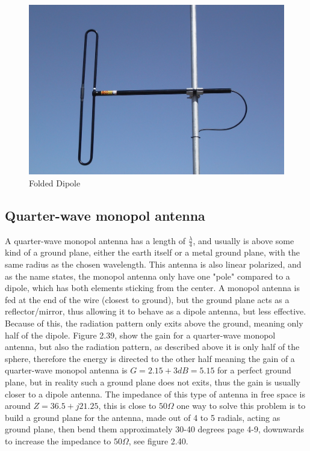 \begin{figure}[h]
\centering
\includegraphics[scale=0.9]{figures/FoldedDipole.jpg}
\caption{Folded Dipole}
\end{figure}

\subsection{Quarter-wave monopol antenna}
A quarter-wave monopol antenna has a length of $\frac{\lambda}{4}$, and usually is above some kind of a ground plane, either the earth itself or a metal ground plane, with the same radius as the chosen wavelength. This antenna is also linear polarized, and as the name states, the monopol antenna only have one "pole" compared to a dipole, which has both elements sticking from the center. A monopol antenna is fed at the end of the wire (closest to ground), but the ground plane acts as a reflector/mirror, thus allowing it to behave as a dipole antenna, but less effective. Because of this, the radiation pattern only exits above the ground, meaning only half of the dipole. Figure 2.39, show the gain for a quarter-wave monopol antenna, but also the radiation pattern, as described above it is only half of the sphere, therefore the energy is directed to the other half meaning the gain of a quarter-wave monopol antenna is $G=2.15+3dB=5.15$ for a perfect ground plane, but in reality such a ground plane does not exits, thus the gain is usually closer to a dipole antenna. The impedance of this type of antenna in free space is around $Z=36.5+j21.25$\cite{ImpedanceMonopol}, this is close to $50\Omega$ one way to solve this problem is to build a ground plane for the antenna, made out of 4 to 5 radials, acting as ground plane, then bend them approximately 30-40 degrees\cite{ARRL} page 4-9, downwards to increase the impedance to $50\Omega$, see figure 2.40. 

